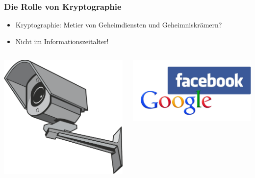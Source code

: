 \documentclass{beamer}
\begin{document}
\begin{frame}
\frametitle{Die Rolle von Kryptographie}

\begin{itemize}
	\item Kryptographie: Metier von Geheimdiensten und Geheimniskrämern?
	\item Nicht im Informationszeitalter!
\end{itemize}
\begin{columns}

	\begin{center}
	\includegraphics[height=0.4\textheight]{images/surveillancecamera.pdf}
	\end{center}

	\begin{center}
	\includegraphics[height=0.3\textheight]{images/fbgoogle.png}
	\end{center}

\end{columns}
\end{frame}
\end{document}
